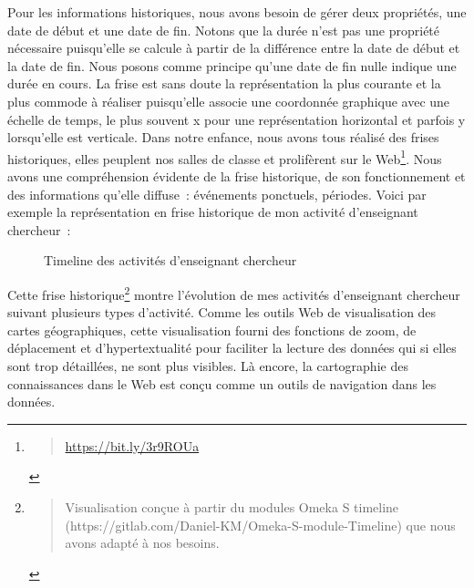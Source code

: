 \documentclass[
  a4paper,
  DIV=11,
  numbers=noendperiod]{scrreprt}
\begin{document}
Pour les informations historiques, nous avons besoin de gérer deux
propriétés, une date de début et une date de fin. Notons que la durée
n'est pas une propriété nécessaire puisqu'elle se calcule à partir de la
différence entre la date de début et la date de fin. Nous posons comme
principe qu'une date de fin nulle indique une durée en cours. La frise
est sans doute la représentation la plus courante et la plus commode à
réaliser puisqu'elle associe une coordonnée graphique avec une échelle
de temps, le plus souvent x pour une représentation horizontal et
parfois y lorsqu'elle est verticale. Dans notre enfance, nous avons tous
réalisé des frises historiques, elles peuplent nos salles de classe et
prolifèrent sur le Web\footnote{\begin{quote}
  \url{https://bit.ly/3r9ROUa}
  \end{quote}}. Nous avons une compréhension évidente de la frise
historique, de son fonctionnement et des informations qu'elle diffuse~:
événements ponctuels, périodes. Voici par exemple la représentation en
frise historique de mon activité d'enseignant chercheur~:

\begin{figure}


\caption{\label{fig-timelineCvSamszo}Timeline des activités d'enseignant
chercheur}

\end{figure}%

Cette frise historique\footnote{\begin{quote}
  Visualisation conçue à partir du modules Omeka S timeline
  (https://gitlab.com/Daniel-KM/Omeka-S-module-Timeline) que nous avons
  adapté à nos besoins.
  \end{quote}} montre l'évolution de mes activités d'enseignant
chercheur suivant plusieurs types d'activité. Comme les outils Web de
visualisation des cartes géographiques, cette visualisation fourni des
fonctions de zoom, de déplacement et d'hypertextualité pour faciliter la
lecture des données qui si elles sont trop détaillées, ne sont plus
visibles. Là encore, la cartographie des connaissances dans le Web est
conçu comme un outils de navigation dans les données.
\end{document}
